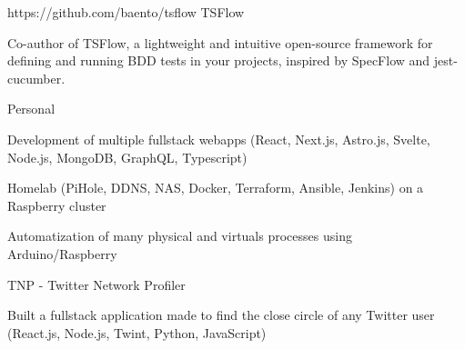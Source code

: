 
\begin{cventries}
  \cventry
    {https://github.com/baento/tsflow} %
    {TSFlow} %
    {} %
    {} %
    {
      \begin{cvitems} %
        \item {Co-author of TSFlow, a lightweight and intuitive open-source framework for defining and running BDD tests in your projects, inspired by SpecFlow and jest-cucumber.}
      \end{cvitems}
    }

  \cventry
    {} %
    {Personal} %
    {} %
    {} %
    {
      \begin{cvitems} %
        \item {Development of multiple fullstack webapps (React, Next.js, Astro.js, Svelte, Node.js, MongoDB, GraphQL, Typescript)}
        \item {Homelab (PiHole, DDNS, NAS, Docker, Terraform, Ansible, Jenkins) on a Raspberry cluster}
		\item {Automatization of many physical and virtuals processes using Arduino/Raspberry}
      \end{cvitems}
    }

  \cventry
    {} %
    {TNP - Twitter Network Profiler} %
    {} %
    {} %
    {
      \begin{cvitems} %
      	\item {Built a fullstack application made to find the close circle of any Twitter user (React.js, Node.js, Twint, Python, JavaScript)}
      \end{cvitems}
    }
\end{cventries}